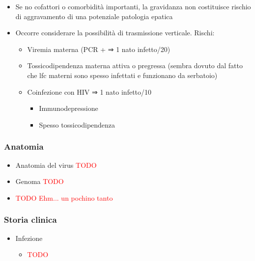 \documentclass[italian,]{article}
\providecommand{\tightlist}{%
  \setlength{\itemsep}{0pt}\setlength{\parskip}{0pt}}
\newcommand{\asidefigure}[2]{\marginpar{\phantom{Img:}\newline\texttt{[image: \#1]}\\\footnotesize\emph{#2}}}
\newcommand{\greenbox}[2]{\begin{tcolorbox}[title=#1,colback=green!5,colframe=green!35!black]#2\end{tcolorbox}} %
\newcommand{\TODO}[1]{\textcolor{red}{\textsf{\footnotesize{TODO #1}}}} %
\begin{document}
\greenbox{Trasmissione verticale di HCV}{
\begin{itemize}
\tightlist
\item
  Se no cofattori o comorbidità importanti, la gravidanza non
  costituisce rischio di aggravamento di una potenziale patologia
  epatica
\item
  Occorre considerare la possibilità di trasmissione verticale. Rischi:

  \begin{itemize}
  \tightlist
  \item
    Viremia materna (PCR + ⇒ 1 nato infetto/20)
  \item
    Tossicodipendenza materna attiva o pregressa (sembra dovuto dal
    fatto che lfc materni sono spesso infettati e funzionano da
    serbatoio)
  \item
    Coinfezione con HIV ⇒ 1 nato infetto/10

    \begin{itemize}
    \tightlist
    \item
      Immunodepressione
    \item
      Spesso tossicodipendenza
    \end{itemize}
  \end{itemize}
\end{itemize}
}

\hypertarget{anatomia-2}{%
\subsubsection{Anatomia}\label{anatomia-2}}

\begin{itemize}
\item
  Anatomia del virus \TODO{}
\item
  Genoma \TODO{}
\item
  \TODO{Ehm... un pochino tanto}
\end{itemize}

\hypertarget{storia-clinica-1}{%
\subsubsection{Storia clinica}\label{storia-clinica-1}}

\begin{itemize}
\tightlist
\item
  Infezione \asidefigure{img/flowchart-storia-epatite-c.png}{}

  \begin{itemize}
  \item
    \TODO{}
  \end{itemize}
\end{itemize}
\end{document}
